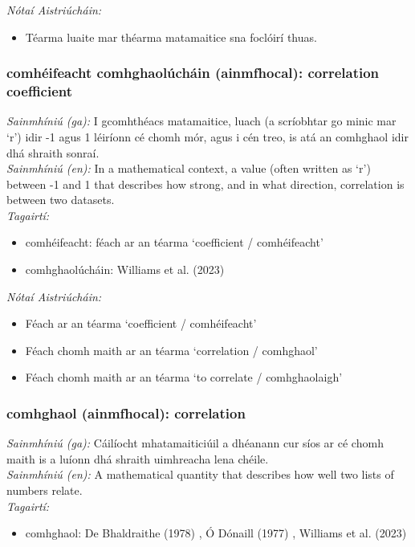 \documentclass{article}
\begin{document}
 \noindent \textit{Nótaí Aistriúcháin:}
\begin{itemize}
	\item Téarma luaite mar théarma matamaitice sna foclóirí thuas.
\end{itemize}


\subsubsection*{comhéifeacht comhghaolúcháin (ainmfhocal): correlation coefficient}
 \noindent \textit{Sainmhíniú (ga):} I gcomhthéacs matamaitice, luach (a scríobhtar go minic mar `r') idir -1 agus 1 léiríonn cé chomh mór, agus i cén treo, is atá an comhghaol idir dhá shraith sonraí.
\\
 \noindent \textit{Sainmhíniú (en):} In a mathematical context, a value (often written as `r') between -1 and 1 that describes how strong, and in what direction, correlation is between two datasets.
\\
 \noindent \textit{Tagairtí:}
\begin{itemize}
	\item comhéifeacht: féach ar an téarma `coefficient / comhéifeacht'
	\item comhghaolúcháin: Williams et al. (2023) \cite{storchiste}
\end{itemize}

 \noindent \textit{Nótaí Aistriúcháin:}
\begin{itemize}
	\item Féach ar an téarma `coefficient / comhéifeacht'
	\item Féach chomh maith ar an téarma `correlation / comhghaol'
	\item Féach chomh maith ar an téarma `to correlate / comhghaolaigh'
\end{itemize}


\subsubsection*{comhghaol (ainmfhocal): correlation}
 \noindent \textit{Sainmhíniú (ga):} Cáilíocht mhatamaiticiúil a dhéanann cur síos ar cé chomh maith is a luíonn dhá shraith uimhreacha lena chéile.
\\
 \noindent \textit{Sainmhíniú (en):} A mathematical quantity that describes how well two lists of numbers relate.
\\
 \noindent \textit{Tagairtí:}
\begin{itemize}
	\item comhghaol: De Bhaldraithe (1978) \cite{de-bhaldraithe}, Ó Dónaill (1977) \cite{odonaill}, Williams et al. (2023) \cite{storchiste}
\end{itemize}
\end{document}
